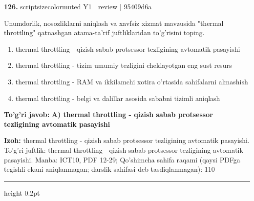 \documentclass[10pt,a4paper]{article}
\begin{document}
{\bfseries\sffamily\color{ink} 126.} {scriptsizecolor{muted} Y1 | review | 95409d6a}
\par
Unumdorlik, nosozliklarni aniqlash va xavfsiz xizmat mavzusida "thermal throttling" qatnashgan atama-ta'rif juftliklaridan to'g'risini toping.
\begin{enumerate}[label=\Alph*),leftmargin=9mm]
\item thermal throttling - qizish sabab protsessor tezligining avtomatik pasayishi
\item thermal throttling - tizim umumiy tezligini cheklayotgan eng sust resurs
\item thermal throttling - RAM va ikkilamchi xotira o'rtasida sahifalarni almashish
\item thermal throttling - belgi va dalillar asosida sababni tizimli aniqlash
\end{enumerate}
\begin{tcolorbox}[enhanced,breakable,colback=teal!4,colframe=teal!60!black,boxrule=0.45pt,arc=1.2mm,left=2.7mm,right=2.7mm,top=1.8mm,bottom=1.8mm,before skip=2mm,after skip=2mm]
{\bfseries\sffamily\color{teal}To'g'ri javob:} \textbf{A) thermal throttling - qizish sabab protsessor tezligining avtomatik pasayishi}
\par\smallskip
{\bfseries Izoh:} thermal throttling - qizish sabab protsessor tezligining avtomatik pasayishi. To'g'ri juftlik: thermal throttling - qizish sabab protsessor tezligining avtomatik pasayishi. Manba: ICT10, PDF 12-29; Qo'shimcha sahifa raqami (qaysi PDFga tegishli ekani aniqlanmagan; darslik sahifasi deb tasdiqlanmagan): 110
\end{tcolorbox}
\vspace{2mm}\hrule height 0.2pt\vspace{3mm}
\end{document}
